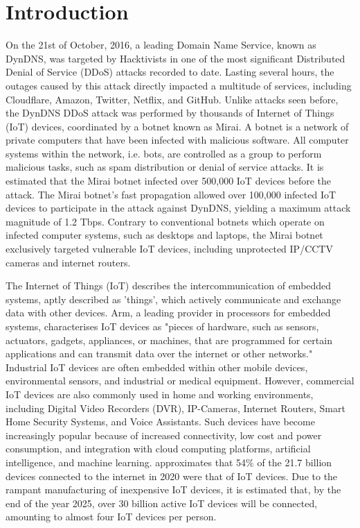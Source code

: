 \chapter{Introduction}


On the 21st of October, 2016, a leading Domain Name Service, known as DynDNS, was targeted by Hacktivists in one of the most significant Distributed Denial of Service (DDoS) attacks recorded to date. Lasting several hours, the outages caused by this attack directly impacted a multitude of services, including Cloudflare, Amazon, Twitter, Netflix, and GitHub. \citep{Maunder2016} Unlike attacks seen before, the DynDNS DDoS attack was performed by thousands of Internet of Things (IoT) devices, coordinated by a botnet known as Mirai. A botnet is a network of private computers that have been infected with malicious software. All computer systems within the network, i.e. bots, are controlled as a group to perform malicious tasks, such as spam distribution or denial of service attacks. \citep{Lexico2021} It is estimated that the Mirai botnet infected over 500,000 IoT devices before the attack. The Mirai botnet's fast propagation allowed over 100,000 infected IoT devices to participate in the attack against DynDNS, yielding a maximum attack magnitude of 1.2 Tbps. \citep{Threatpost2016} Contrary to conventional botnets which operate on infected computer systems, such as desktops and laptops, the Mirai botnet exclusively targeted vulnerable IoT devices, including unprotected IP/CCTV cameras and internet routers.

The Internet of Things (IoT) describes the intercommunication of embedded systems, aptly described as 'things', which actively communicate and exchange data with other devices. \citep{Oracle2021} Arm, a leading provider in processors for embedded systems, characterises IoT devices as "pieces of hardware, such as sensors, actuators, gadgets, appliances, or machines, that are programmed for certain applications and can transmit data over the internet or other networks." \citep{Arm2021} Industrial IoT devices are often embedded within other mobile devices, environmental sensors, and industrial or medical equipment. However, commercial IoT devices are also commonly used in home and working environments, including Digital Video Recorders (DVR), IP-Cameras, Internet Routers, Smart Home Security Systems, and Voice Assistants. Such devices have become increasingly popular because of increased connectivity, low cost and power consumption, and integration with cloud computing platforms, artificial intelligence, and machine learning. \citep{Oracle2021} \citet{Lueth2020} approximates that 54\% of the 21.7 billion devices connected to the internet in 2020 were that of IoT devices. Due to the rampant manufacturing of inexpensive IoT devices, it is estimated that, by the end of the year 2025, over 30 billion active IoT devices will be connected, amounting to almost four IoT devices per person.

